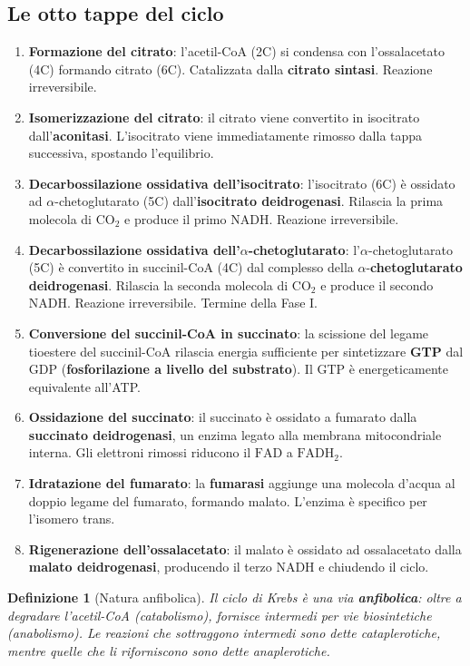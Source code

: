 \documentclass[12pt,a4paper]{report}
\newtheorem{definizione}{Definizione}[section]
\begin{document}
\subsection{Le otto tappe del ciclo}
\begin{enumerate}
\item \textbf{Formazione del citrato}: l'acetil-CoA (2C) si condensa con l'ossalacetato (4C) formando citrato (6C). Catalizzata dalla \textbf{citrato sintasi}. Reazione irreversibile.
\item \textbf{Isomerizzazione del citrato}: il citrato viene convertito in isocitrato dall'\textbf{aconitasi}. L'isocitrato viene immediatamente rimosso dalla tappa successiva, spostando l'equilibrio.
\item \textbf{Decarbossilazione ossidativa dell'isocitrato}: l'isocitrato (6C) è ossidato ad \(\alpha\)-chetoglutarato (5C) dall'\textbf{isocitrato deidrogenasi}. Rilascia la prima molecola di \(\mathrm{CO_2}\) e produce il primo \(\mathrm{NADH}\). Reazione irreversibile.
\item \textbf{Decarbossilazione ossidativa dell'\(\alpha\)-chetoglutarato}: l'\(\alpha\)-chetoglutarato (5C) è convertito in succinil-CoA (4C) dal complesso della \(\alpha\)-\textbf{chetoglutarato deidrogenasi}. Rilascia la seconda molecola di \(\mathrm{CO_2}\) e produce il secondo \(\mathrm{NADH}\). Reazione irreversibile. Termine della Fase I.
\item \textbf{Conversione del succinil-CoA in succinato}: la scissione del legame tioestere del succinil-CoA rilascia energia sufficiente per sintetizzare \textbf{GTP} dal GDP (\textbf{fosforilazione a livello del substrato}). Il GTP è energeticamente equivalente all'ATP.
\item \textbf{Ossidazione del succinato}: il succinato è ossidato a fumarato dalla \textbf{succinato deidrogenasi}, un enzima legato alla membrana mitocondriale interna. Gli elettroni rimossi riducono il \(\mathrm{FAD}\) a \(\mathrm{FADH_2}\).
\item \textbf{Idratazione del fumarato}: la \textbf{fumarasi} aggiunge una molecola d'acqua al doppio legame del fumarato, formando malato. L'enzima è specifico per l'isomero trans.
\item \textbf{Rigenerazione dell'ossalacetato}: il malato è ossidato ad ossalacetato dalla \textbf{malato deidrogenasi}, producendo il terzo \(\mathrm{NADH}\) e chiudendo il ciclo.
\end{enumerate}
\begin{definizione}[Natura anfibolica]
Il ciclo di Krebs è una via \textbf{anfibolica}: oltre a degradare l'acetil-CoA (catabolismo), fornisce intermedi per vie biosintetiche (anabolismo). Le reazioni che sottraggono intermedi sono dette \textit{cataplerotiche}, mentre quelle che li riforniscono sono dette \textit{anaplerotiche}.
\end{definizione}
\end{document}
